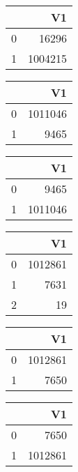 \bigskip\bigskip
\centering
\begin{tabular}{rr}
  \hline
 & V1 \\ 
  \hline
0 & 16296 \\ 
  1 & 1004215 \\ 
   \hline
\end{tabular}

\bigskip\bigskip
\centering
\begin{tabular}{rr}
  \hline
 & V1 \\ 
  \hline
0 & 1011046 \\ 
  1 & 9465 \\ 
   \hline
\end{tabular}

\bigskip\bigskip
\centering
\begin{tabular}{rr}
  \hline
 & V1 \\ 
  \hline
0 & 9465 \\ 
  1 & 1011046 \\ 
   \hline
\end{tabular}

\bigskip\bigskip
\centering
\begin{tabular}{rr}
  \hline
 & V1 \\ 
  \hline
0 & 1012861 \\ 
  1 & 7631 \\ 
  2 &  19 \\ 
   \hline
\end{tabular}

\bigskip\bigskip
\centering
\begin{tabular}{rr}
  \hline
 & V1 \\ 
  \hline
0 & 1012861 \\ 
  1 & 7650 \\ 
   \hline
\end{tabular}

\bigskip\bigskip
\centering
\begin{tabular}{rr}
  \hline
 & V1 \\ 
  \hline
0 & 7650 \\ 
  1 & 1012861 \\ 
   \hline
\end{tabular}

